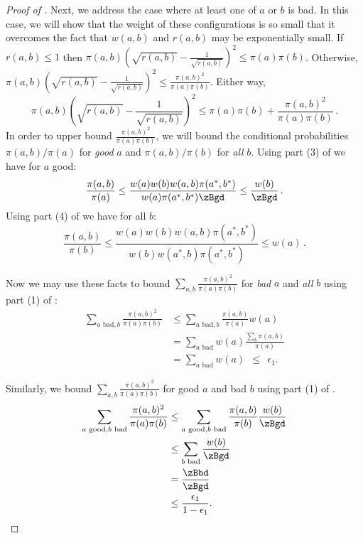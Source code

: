 \documentclass{toc}
\begin{document}
\begin{proof}[Proof of ]
Next, we address the case where at least one of $a$ or $b$ is bad.  In this case, we
will show that the weight of these configurations is so small that
it overcomes the fact that $w(a,b)$ and $r(a,b)$ may be exponentially small.  
If $r(a,b)\leq 1$ then
$\pi(a,b)\left(\sqrt{r(a,b)}-\frac{1}{\sqrt{r(a,b)}}\right)^2\leq
\pi(a)\pi(b)$.  Otherwise,
$\pi(a,b)\left(\sqrt{r(a,b)}-\frac{1}{\sqrt{r(a,b)}}\right)^2\leq
\frac{\pi(a,b)^2}{\pi(a)\pi(b)}.$  Either way,
\[\pi(a,b)\left(\sqrt{r(a,b)}-\frac{1}{\sqrt{r(a,b)}}\right)^2\leq
\pi(a)\pi(b) + \frac{\pi(a,b)^2}{\pi(a)\pi(b)}\,.\]
In order to upper bound $\frac{\pi(a,b)^2}{\pi(a)\pi(b)}$, we will
bound the conditional probabilities $\pi(a,b)/\pi(a)$ for \emph{good} 
$a$ and $\pi(a,b)/\pi(b)$ for \emph{all} $b$.  Using part (3) of  
we have for $a$ good:
$$\frac{\pi(a,b)}{\pi(a)} \leq \frac{w(a)w(b)w(a,b)\pi(a^*,b^*)}{w(a)\pi(a^*,b^*)\zBgd} \leq \frac{w(b)}{\zBgd}\,.$$
Using part (4) of  we have for all $b$:
$$\frac{\pi(a,b)}{\pi(b)} \leq \frac{w(a)w(b)w(a,b)\pi(a^*,b^*)}{w(b)w(a^*,b)\pi(a^*,b^*)} \leq w(a)\,.$$
 
\noindent Now we may use these facts to bound $\sum_{a,b} 
\frac{\pi(a,b)^2}{\pi(a)\pi(b)}$ for \emph{bad} $a$ and \emph{all} $b$ 
using part (1) of :
 \begin{align*}
   \sum_{a \text{ bad},b} \frac{\pi(a,b)^2}{\pi(a)\pi(b)}
      &\leq  \sum_{a \text{ bad},b} \frac{\pi(a,b)}{\pi(a)}w(a) \\ 
   &= \sum_{a \text{ bad}} w(a) \frac{ \sum_b \pi(a,b)}{\pi(a)} \\ 
 &= \sum_{a \text{ bad}} w(a)~~ \leq ~~\epsilon_1.
 \end{align*}
 
\noindent Similarly, we bound $\sum_{a,b} \frac{\pi(a,b)^2}{\pi(a)\pi(b)}$ 
for good $a$ and bad $b$ using part (1) of .
  \begin{align*}
    \sum_{a \text{ good},b\text{ bad}} \frac{\pi(a,b)^2}{\pi(a)\pi(b)}
    &\leq \sum_{a \text{ good},b\text{ bad}}
    \frac{\pi(a,b)}{\pi(b)}\frac{w(b)}{\zBgd}\\
    &\leq \sum_{b\text{ bad}} \frac{w(b)}{\zBgd}\\
    &= \frac{\zBbd}{\zBgd}\\
    &\leq \frac{\epsilon_1}{1- \epsilon_1}.
 \end{align*}
 

\end{proof}
\end{document}
